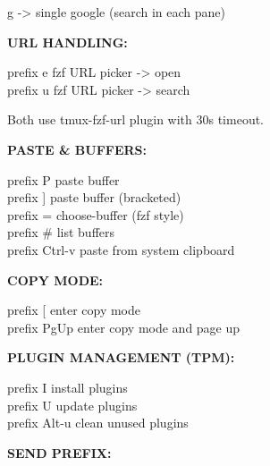 \documentclass[11pt,a4paper,twoside]{book}
\begin{document}
g     -> single google (search in each pane)


\vspace{12pt}
{\bfseries\color{neonyellow} URL HANDLING:}\vspace{4pt}

\begin{codebox}
prefix e              fzf URL picker -> open\\
prefix u              fzf URL picker -> search\\
\end{codebox}

Both use tmux-fzf-url plugin with 30s timeout.


\vspace{12pt}
{\bfseries\color{neonyellow} PASTE \& BUFFERS:}\vspace{4pt}

\begin{codebox}
prefix P              paste buffer\\
prefix ]              paste buffer (bracketed)\\
prefix =              choose-buffer (fzf style)\\
prefix \#              list buffers\\
prefix Ctrl-v         paste from system clipboard\\
\end{codebox}


\vspace{12pt}
{\bfseries\color{neonyellow} COPY MODE:}\vspace{4pt}

\begin{codebox}
prefix [              enter copy mode\\
prefix PgUp           enter copy mode and page up\\
\end{codebox}


\vspace{12pt}
{\bfseries\color{neonyellow} PLUGIN MANAGEMENT (TPM):}\vspace{4pt}

\begin{codebox}
prefix I              install plugins\\
prefix U              update plugins\\
prefix Alt-u          clean unused plugins\\
\end{codebox}


\vspace{12pt}
{\bfseries\color{neonyellow} SEND PREFIX:}\vspace{4pt}
\end{document}
